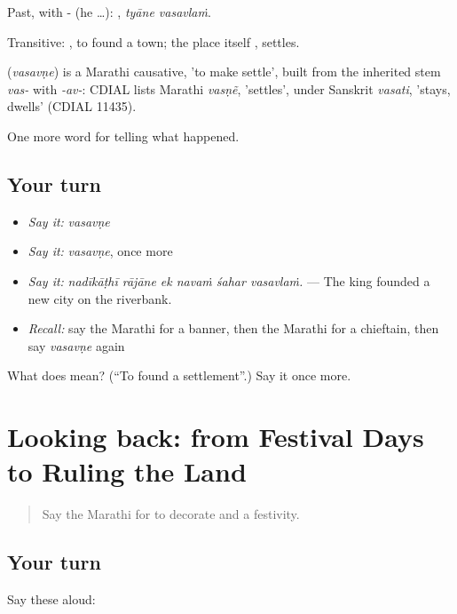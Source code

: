 Past, with - (he …):  , \emph{tyāne vasavlaṁ}.

Transitive:  , to found a town; the place itself , settles.

\begin{cousinweb}
\textbf{} (\emph{vasavṇe}) is a Marathi causative, 'to make settle', built from the inherited stem \emph{vas-} with \emph{-av-}: CDIAL lists Marathi \emph{vasṇẽ}, 'settles', under Sanskrit \emph{vasati}, 'stays, dwells' (CDIAL 11435).
\end{cousinweb}

\begin{grammarlens}[title={What you've built}]
One more word for telling what happened.
\end{grammarlens}

\subsection*{Your turn}
\begin{itemize}
\raggedright
  \item \emph{Say it:} \emph{vasavṇe}
  \item \emph{Say it:} \emph{vasavṇe}, once more
  \item \emph{Say it:} \emph{nadīkāṭhī rājāne ek navaṁ śahar vasavlaṁ.} — The king founded a new city on the riverbank.
  \item \emph{Recall:} say the Marathi for a banner, then the Marathi for a chieftain, then say \emph{vasavṇe} again
\end{itemize}

\begin{tcolorbox}[breakable,colback=teal!4,colframe=teal!35!black,title={Before you move on}]
What does  mean? (\textquotedblleft{}To found a settlement\textquotedblright{}.) Say it once more.
\end{tcolorbox}
\section[(dialogue)]{Looking back: from Festival Days to Ruling the Land}

\label{lesson:MR-R327-review-320-327}



\begin{quote}
Say the Marathi for to decorate and a festivity.
\end{quote}

\subsection*{Your turn}
Say these aloud:

